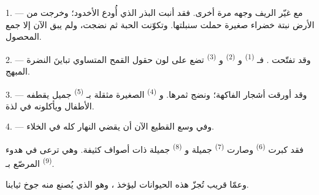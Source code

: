 %


\VUsaut{5.0mm}
\VUsaut{3.0mm}
\VUsaut{3.0mm}
\VUsaut{4.0mm}
\VUsaut{3.0mm}

1. --- مع  غيّر الريف وجهه مرة أخرى. فقد أنبت البذر الذي
أُودع الأخدود؛ وخرجت من الأرض نبتة خضراء صغيرة حملت سنبلتها. وتكوّنت
الحبة ثم نضجت، ولم يبق الآن إلا جمع المحصول.

2. --- وقد تفتّحت . فـ \textsuperscript{(1)}
و \textsuperscript{(2)} و
\textsuperscript{(3)} تضع على لون حقول القمح المتساوي تباينَ 
النضرة المبهج.

3. --- وقد أورقت أشجار الفاكهة؛ ونضج ثمرها. و
\textsuperscript{(4)} الصغيرة مثقلة بـ \textsuperscript{(5)} جميل يقطفه
الأطفال ويأكلونه في لذة.

4. --- وفي وسع القطيع الآن أن يقضي النهار كله في الخلاء.

فقد كبرت  \textsuperscript{(6)} وصارت 
\textsuperscript{(7)} جميلة و \textsuperscript{(8)} جميلة ذات أصواف
كثيفة. وهي ترعى في هدوء   \textsuperscript{(9)}
المرصّع بـ.

وعمّا قريب تُجزّ هذه الحيوانات ليؤخذ ، وهو الذي يُصنع منه
جوخ ثيابنا.

\VUsaut{5.0mm}
\VUsaut{3.4mm}

